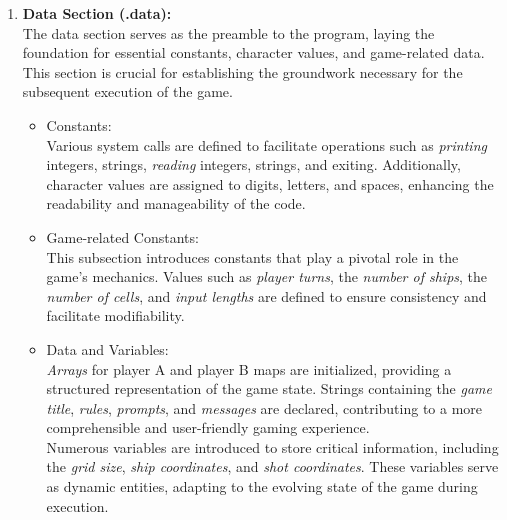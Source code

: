 \begin{enumerate}
    \item \textbf{Data Section (.data):} \\
    The data section serves as the preamble to the program, laying the foundation for essential constants, character values, and game-related data. This section is crucial for establishing the groundwork necessary for the subsequent execution of the game.
        \begin{itemize}
            \item Constants: \\
            Various system calls are defined to facilitate operations such as \textit{printing} integers, strings, \textit{reading} integers, strings, and exiting. Additionally, character values are assigned to digits, letters, and spaces, enhancing the readability and manageability of the code.
            \item Game-related Constants: \\
            This subsection introduces constants that play a pivotal role in the game's mechanics. Values such as \textit{player turns}, the \textit{number of ships}, the \textit{number of cells}, and \textit{input lengths} are defined to ensure consistency and facilitate modifiability.
            \item Data and Variables: \\
            \textit{Arrays} for player A and player B maps are initialized, providing a structured representation of the game state. Strings containing the \textit{game title}, \textit{rules}, \textit{prompts}, and \textit{messages} are declared, contributing to a more comprehensible and user-friendly gaming experience.\\
            Numerous variables are introduced to store critical information, including the \textit{grid size}, \textit{ship coordinates}, and \textit{shot coordinates}. These variables serve as dynamic entities, adapting to the evolving state of the game during execution.
        \end{itemize}


\end{enumerate}
